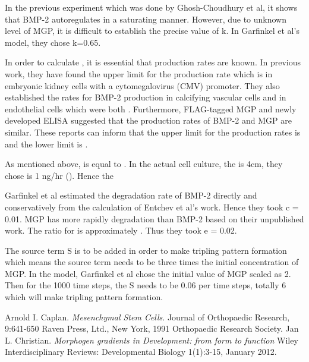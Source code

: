 \documentclass[12pt]{article}
\begin{document}
In the previous experiment which was done by Ghosh-Choudhury et al, it shows that BMP-2 autoregulates in a saturating manner. However, due to unknown level of MGP, it is difficult to establish the precise value of k. In Garfinkel et al’s model, they chose k=0.65.

In order to calculate , it is essential that production rates are known. In previous work, they have found the upper limit for the production rate which is in embryonic kidney cells with a cytomegalovirus (CMV) promoter. They also established the rates for BMP-2 production in calcifying vascular cells and in endothelial cells which were both . Furthermore, FLAG-tagged MGP and newly developed ELISA suggested that the production rates of BMP-2 and MGP are similar. These reports can inform that the upper limit for the production rates is  and the lower limit is .

 As mentioned above,  is equal to . In the actual cell culture, the is 4cm,  they chose is 1 ng/hr (). Hence the 

Garfinkel et al estimated the degradation rate of BMP-2 directly and conservatively from the calculation of Entchev et al’s work. Hence they took c = 0.01. MGP has more rapidly degradation than BMP-2 based on their unpublished work. The ratio for  is approximately . Thus they took e = 0.02.

The source term S is to be added in order to make tripling pattern formation which means the source term needs to be three times the initial concentration of MGP. In the model, Garfinkel et al chose the initial value of MGP scaled as 2. Then for the 1000 time steps, the S needs to be 0.06 per time steps, totally 6 which will make tripling pattern formation.


\begin{thebibliography}{}
	Arnold I. Caplan. 
	\textit{Mesenchymal Stem Cells}. 
	Journal of Orthopaedic Research, 9:641-650 Raven Press, Ltd., New York, 1991 Orthopaedic Research Society.
	Jan L. Christian.
	\textit{Morphogen gradients in Development: from form to function}
	 Wiley Interdisciplinary Reviews: Developmental Biology 1(1):3-15, January 2012.

\end{thebibliography}
\end{document}
